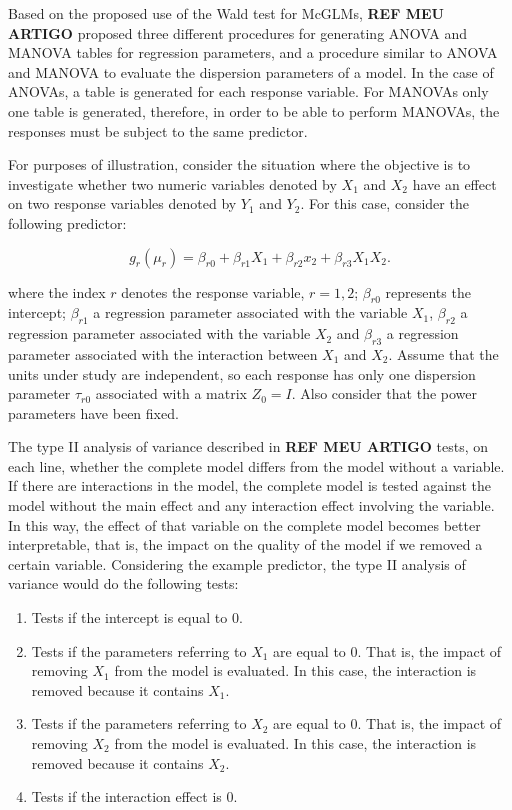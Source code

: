 \documentclass[article]{jss}\usepackage[]{graphicx}\usepackage[]{xcolor}
\begin{document}
Based on the proposed use of the Wald test for McGLMs, \textbf{REF MEU ARTIGO} proposed three different procedures for generating ANOVA and MANOVA tables for regression parameters, and a procedure similar to ANOVA and MANOVA to evaluate the dispersion parameters of a model. In the case of ANOVAs, a table is generated for each response variable. For MANOVAs only one table is generated, therefore, in order to be able to perform MANOVAs, the responses must be subject to the same predictor.

For purposes of illustration, consider the situation where the objective is to investigate whether two numeric variables denoted by $X_1$ and $X_2$ have an effect on two response variables denoted by $Y_1$ and $Y_2$. For this case, consider the following predictor:

$$
g_r(\mu_r) = \beta_{r0} + \beta_{r1} X_1 + \beta_{r2} x_2 + \beta_{r3} X_1X_2.
$$

\noindent where the index $r$ denotes the response variable, $r = 1,2$; $\beta_{r0}$ represents the intercept; $\beta_{r1}$ a regression parameter associated with the variable $X_1$, $\beta_{r2}$ a regression parameter associated with the variable $X_2$ and $\beta_{r3}$ a regression parameter associated with the interaction between $X_1$ and $X_2$. Assume that the units under study are independent, so each response has only one dispersion parameter $\tau_{r0}$ associated with a matrix $Z_0 = I$. Also consider that the power parameters have been fixed.

The type II analysis of variance described in \textbf{REF MEU ARTIGO} tests, on each line, whether the complete model differs from the model without a variable. If there are interactions in the model, the complete model is tested against the model without the main effect and any interaction effect involving the variable. In this way, the effect of that variable on the complete model becomes better interpretable, that is, the impact on the quality of the model if we removed a certain variable. Considering the example predictor, the type II analysis of variance would do the following tests:

\begin{enumerate}
  \item Tests if the intercept is equal to 0.
  
  \item Tests if the parameters referring to $X_1$ are equal to 0. That is, the impact of removing $X_1$ from the model is evaluated. In this case, the interaction is removed because it contains $X_1$.
  
  \item Tests if the parameters referring to $X_2$ are equal to 0. That is, the impact of removing $X_2$ from the model is evaluated. In this case, the interaction is removed because it contains $X_2$.
  
  \item Tests if the interaction effect is 0.

\end{enumerate}
\end{document}

